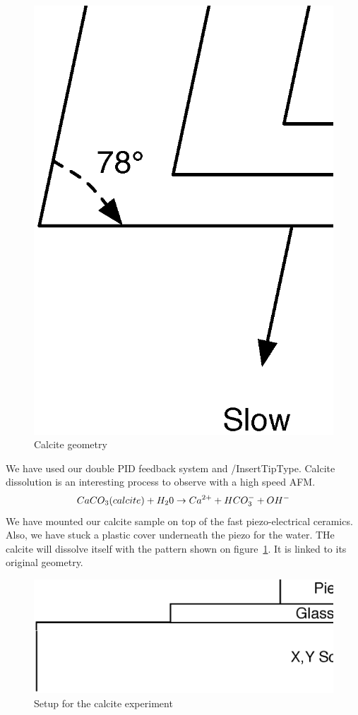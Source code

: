 \begin{figure}[H]
  \centering
  \includegraphics[scale=0.3]{images/calcitegeometry.eps}
    \caption{Calcite geometry}
  \label{fig:calcitegeometry}
\end{figure}
We have used our double PID feedback system and /InsertTipType. Calcite dissolution is an interesting process to observe with a high speed AFM.
\begin{equation}\label{calcite}
\centering
	CaCO_3(calcite) + H_20 \rightarrow Ca^{2+} + HCO_3^- + OH^- 
\end{equation}
We have mounted our calcite sample on top of the fast piezo-electrical ceramics. Also, we have stuck a plastic cover underneath the piezo for the water. THe calcite will dissolve itself with the pattern shown on figure~\ref{fig:calcitegeometry}. It is linked to its original geometry.
\begin{figure}[H]
  \centering
  \includegraphics[scale=0.4]{images/calcitesetup.eps}
    \caption{Setup for the calcite experiment}
  \label{fig:calcitesetup}
\end{figure}

